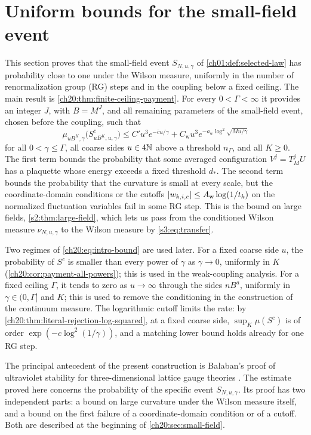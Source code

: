 \chapter{Uniform bounds for the small-field event}\label{ch20:chapter}

This section proves that the small-field event $S_{N,u,\gamma}$ of \cref{ch01:def:selected-law} has probability close to one under the Wilson measure, uniformly in the number of renormalization group (RG) steps and in the coupling below a fixed ceiling. The main result is \cref{ch20:thm:finite-ceiling-payment}. For every $0<\Gamma<\infty$ it provides an integer $J$, with $B=M^J$, and all remaining parameters of the small-field event, chosen before the coupling, such that
\begin{equation}\label{ch20:eq:intro-bound}
 \mu_{uB^K,\gamma}\bigl(S_{uB^K,u,\gamma}^c\bigr)
 \le C'u^3e^{-\bar cu/\gamma}
 +C_{\mathrm w}u^3e^{-a_{\mathrm w}\log^2\sqrt{Mu/\gamma}}
\end{equation}
for all $0<\gamma\le\Gamma$, all coarse sides $u\in4\mathbb N$ above a threshold $n_\Gamma$, and all $K\ge0$. The first term bounds the probability that some averaged configuration $V^j=T_M^jU$ has a plaquette whose energy exceeds a fixed threshold $d_*$. The second term bounds the probability that the curvature is small at every scale, but the coordinate-domain conditions or the cutoffs $\lvert w_{k,i,e}\rvert\le A_{\mathrm w}\log(1/t_k)$ on the normalized fluctuation variables fail in some RG step. This is the bound on large fields, \cref{s2:thm:large-field}, which lets us pass from the conditioned Wilson measure $\nu_{N,u,\gamma}$ to the Wilson measure by \eqref{s3:eq:transfer}.

Two regimes of \eqref{ch20:eq:intro-bound} are used later. For a fixed coarse side $u$, the probability of $S^c$ is smaller than every power of $\gamma$ as $\gamma\to0$, uniformly in $K$ (\cref{ch20:cor:payment-all-powers}); this is used in the weak-coupling analysis. For a fixed ceiling $\Gamma$, it tends to zero as $u\to\infty$ through the sides $nB^a$, uniformly in $\gamma\in(0,\Gamma]$ and $K$; this is used to remove the conditioning in the construction of the continuum measure. The logarithmic cutoff limits the rate: by \cref{ch20:thm:literal-rejection-log-squared}, at a fixed coarse side, $\sup_K\mu(S^c)$ is of order $\exp(-c\log^2(1/\gamma))$, and a matching lower bound holds already for one RG step.

The principal antecedent of the present construction is Ba{\l}aban's proof of ultraviolet stability for three-dimensional lattice gauge theories \cite{Balaban1985UV}. The estimate proved here concerns the probability of the specific event $S_{N,u,\gamma}$. Its proof has two independent parts: a bound on large curvature under the Wilson measure itself, and a bound on the first failure of a coordinate-domain condition or of a cutoff. Both are described at the beginning of \cref{ch20:sec:small-field}.

